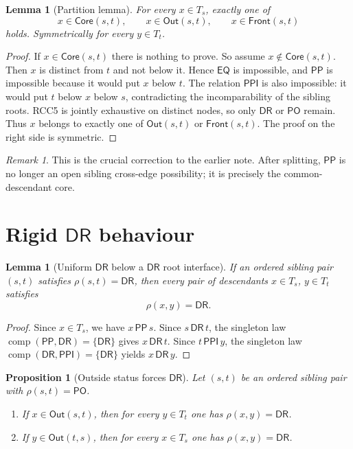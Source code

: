 \documentclass[11pt]{article}
\newtheorem{proposition}[definition]{Proposition}
\newtheorem{lemma}[definition]{Lemma}
\theoremstyle{remark}
\newtheorem{remark}[definition]{Remark}
\newcommand{\DR}{\mathsf{DR}}
\newcommand{\PO}{\mathsf{PO}}
\newcommand{\PP}{\mathsf{PP}}
\newcommand{\PPI}{\mathsf{PPI}}
\newcommand{\EQ}{\mathsf{EQ}}
\newcommand{\comp}{\operatorname{comp}}
\newcommand{\Core}{\mathsf{Core}}
\newcommand{\Out}{\mathsf{Out}}
\newcommand{\Front}{\mathsf{Front}}
\begin{document}
\begin{lemma}[Partition lemma]\label{lem:partition-completed}
For every $x\in T_s$, exactly one of
\[
 x\in \Core(s,t),\qquad x\in \Out(s,t),\qquad x\in \Front(s,t)
\]
holds. Symmetrically for every $y\in T_t$.
\end{lemma}

\begin{proof}
If $x\in \Core(s,t)$ there is nothing to prove. So assume $x\notin \Core(s,t)$. Then $x$ is distinct from $t$ and not below it. Hence $\EQ$ is impossible, and $\PP$ is impossible because it would put $x$ below $t$. The relation $\PPI$ is also impossible: it would put $t$ below $x$ below $s$, contradicting the incomparability of the sibling roots. RCC5 is jointly exhaustive on distinct nodes, so only $\DR$ or $\PO$ remain. Thus $x$ belongs to exactly one of $\Out(s,t)$ or $\Front(s,t)$. The proof on the right side is symmetric.
\end{proof}

\begin{remark}
This is the crucial correction to the earlier note. After splitting, $\PP$ is no longer an open sibling cross-edge possibility; it is precisely the common-descendant core.
\end{remark}

\section{Rigid $\DR$ behaviour}

\begin{lemma}[Uniform $\DR$ below a $\DR$ root interface]\label{lem:uniform-dr}
If an ordered sibling pair $(s,t)$ satisfies $\rho(s,t)=\DR$, then every pair of descendants $x\in T_s$, $y\in T_t$ satisfies
\[
\rho(x,y)=\DR.
\]
\end{lemma}

\begin{proof}
Since $x\in T_s$, we have $x\,\PP\,s$. Since $s\,\DR\,t$, the singleton law $\comp(\PP,\DR)=\{\DR\}$ gives $x\,\DR\,t$. Since $t\,\PPI\,y$, the singleton law $\comp(\DR,\PPI)=\{\DR\}$ yields $x\,\DR\,y$.
\end{proof}

\begin{proposition}[Outside status forces $\DR$]\label{prop:out-dr}
Let $(s,t)$ be an ordered sibling pair with $\rho(s,t)=\PO$.
\begin{enumerate}[label=(\alph*)]
    \item If $x\in \Out(s,t)$, then for every $y\in T_t$ one has $\rho(x,y)=\DR$.
    \item If $y\in \Out(t,s)$, then for every $x\in T_s$ one has $\rho(x,y)=\DR$.
\end{enumerate}
\end{proposition}
\end{document}
